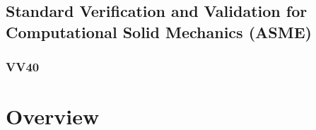 \subsection{Standard Verification and Validation for Computational Solid Mechanics (ASME)}
\subsubsection*{VV40}



\section{Overview}